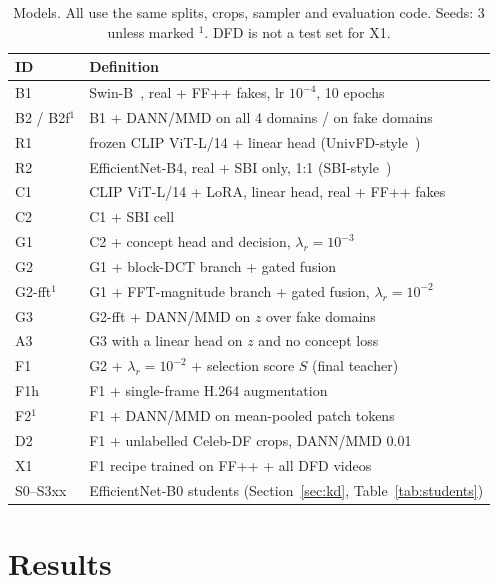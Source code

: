 \documentclass[conference]{IEEEtran}
\begin{document}
\begin{table}[t]
\centering\footnotesize
\setlength{\tabcolsep}{3pt}
\caption{Models. All use the same splits, crops, sampler and evaluation code. Seeds: 3 unless marked $^1$. DFD is
not a test set for X1.}
\label{tab:models}
\begin{tabular}{ll}
\toprule
ID & Definition \\
\midrule
B1 & Swin-B~\cite{swin}, real + FF++ fakes, lr $10^{-4}$, 10 epochs \\
B2 / B2f$^1$ & B1 + DANN/MMD on all 4 domains / on fake domains \\
R1 & frozen CLIP ViT-L/14 + linear head (UnivFD-style~\cite{univfd}) \\
R2 & EfficientNet-B4, real + SBI only, 1:1 (SBI-style~\cite{sbi}) \\
C1 & CLIP ViT-L/14 + LoRA, linear head, real + FF++ fakes \\
C2 & C1 + SBI cell \\
G1 & C2 + concept head and decision, $\lambda_r=10^{-3}$ \\
G2 & G1 + block-DCT branch + gated fusion \\
G2-fft$^1$ & G1 + FFT-magnitude branch + gated fusion, $\lambda_r=10^{-2}$ \\
G3 & G2-fft + DANN/MMD on $z$ over fake domains \\
A3 & G3 with a linear head on $z$ and no concept loss \\
F1 & G2 + $\lambda_r=10^{-2}$ + selection score $S$ (final teacher) \\
F1h & F1 + single-frame H.264 augmentation \\
F2$^1$ & F1 + DANN/MMD on mean-pooled patch tokens \\
D2 & F1 + unlabelled Celeb-DF crops, DANN/MMD 0.01 \\
X1 & F1 recipe trained on FF++ + all DFD videos \\
S0--S3xx & EfficientNet-B0 students (Section~\ref{sec:kd}, Table~\ref{tab:students}) \\
\bottomrule
\end{tabular}
\end{table}

\section{Results}\label{sec:results}
\end{document}
